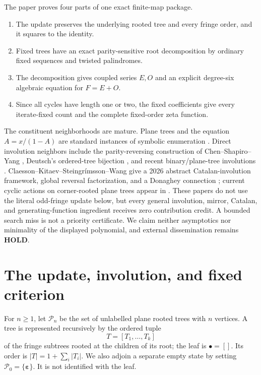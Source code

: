 \documentclass[10pt,a4paper]{amsart}
\theoremstyle{definition}
\theoremstyle{remark}
\newcommand{\PT}{\mathcal P}
\newcommand{\eps}{\boldsymbol\varepsilon}
\begin{document}
The paper proves four parts of one exact finite-map package.
\begin{enumerate}
\item The update preserves the underlying rooted tree and every fringe
  order, and it squares to the identity.
\item Fixed trees have an exact parity-sensitive root decomposition by
  ordinary fixed sequences and twisted palindromes.
\item The decomposition gives coupled series $E,O$ and an explicit
  degree-six algebraic equation for $F=E+O$.
\item Since all cycles have length one or two, the fixed coefficients give
  every iterate-fixed count and the complete fixed-order zeta function.
\end{enumerate}

The constituent neighborhoods are mature.  Plane trees and the equation
$A=x/(1-A)$ are standard instances of symbolic enumeration
\cite{FlajoletSedgewick2009}.  Direct involution neighbors include the
parity-reversing construction of Chen--Shapiro--Yang
\cite{ChenShapiroYang2006}, Deutsch's ordered-tree bijection
\cite{Deutsch2000}, and recent binary/plane-tree involutions
\cite{LiLinZhao2024}.  Claesson--Kitaev--Steingr\'{i}msson--Wang give a 2026
abstract Catalan-involution framework, global reversal factorization, and a
Donaghey connection \cite{ClaessonEtAl2026}; current cyclic actions on
corner-rooted plane trees appear in
\cite{BousquetMelouKrattenthaler2025}.  These papers do not use the literal
odd-fringe update below, but every general involution, mirror, Catalan, and
generating-function ingredient receives zero contribution credit.  A bounded
search miss is not a priority certificate.  We claim neither asymptotics nor
minimality of the displayed polynomial, and external dissemination remains
\textbf{HOLD}.

\section{The update, involution, and fixed criterion}\label{sec:update}

For $n\geq1$, let $\PT_n$ be the set of unlabelled plane rooted trees with
$n$ vertices.  A tree is represented recursively by the ordered tuple
\[
                 T=[T_1,\ldots,T_k]
\]
of the fringe subtrees rooted at the children of its root; the leaf is
$\bullet=[]$.  Its order is
$|T|=1+\sum_i|T_i|$.  We also adjoin a separate empty state by setting
$\PT_0=\{\eps\}$.  It is not identified with the leaf.
\end{document}
